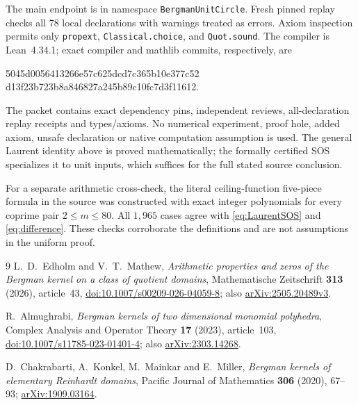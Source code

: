 \documentclass[11pt]{article}
\begin{document}
The main endpoint is  in namespace
\texttt{BergmanUnitCircle}. Fresh pinned replay checks all 78 local
declarations with warnings treated as errors. Axiom inspection permits
only \texttt{propext}, \texttt{Classical.choice}, and
\texttt{Quot.sound}. The compiler is Lean~4.34.1; exact compiler and
mathlib commits, respectively, are
\begin{center}\small\ttfamily
5045d0056413266e57c625dcd7c365b10e377c52\\
d13f23b723b8a846827a245b89c10fc7d3f11612.
\end{center}
The packet contains exact dependency pins, independent reviews,
all-declaration replay receipts and types/axioms. No numerical
experiment, proof hole, added axiom, unsafe declaration or native
computation assumption is used. The general Laurent identity above
is proved mathematically; the formally certified SOS specializes it
to unit inputs, which suffices for the full stated source conclusion.

For a separate arithmetic cross-check, the literal ceiling-function
five-piece formula in the source was constructed with exact integer
polynomials for every coprime pair $2\leq m\leq80$. All $1,965$ cases
agree with \eqref{eq:LaurentSOS} and \eqref{eq:difference}. These checks
corroborate the definitions and are not assumptions in the uniform
proof.

\begin{thebibliography}{9}
L.~D.~Edholm and V.~T.~Mathew,
\emph{Arithmetic properties and zeros of the Bergman kernel on a class
of quotient domains},
Mathematische Zeitschrift \textbf{313} (2026), article~43,
\href{https://doi.org/10.1007/s00209-026-04059-8}{doi:10.1007/s00209-026-04059-8};
also \href{https://arxiv.org/abs/2505.20489v3}{arXiv:2505.20489v3}.

R.~Almughrabi,
\emph{Bergman kernels of two dimensional monomial polyhedra},
Complex Analysis and Operator Theory \textbf{17} (2023), article~103,
\href{https://doi.org/10.1007/s11785-023-01401-4}{doi:10.1007/s11785-023-01401-4};
also \href{https://arxiv.org/abs/2303.14268}{arXiv:2303.14268}.

D.~Chakrabarti, A.~Konkel, M.~Mainkar and E.~Miller,
\emph{Bergman kernels of elementary Reinhardt domains},
Pacific Journal of Mathematics \textbf{306} (2020), 67--93;
\href{https://arxiv.org/abs/1909.03164}{arXiv:1909.03164}.
\end{thebibliography}
\end{document}
